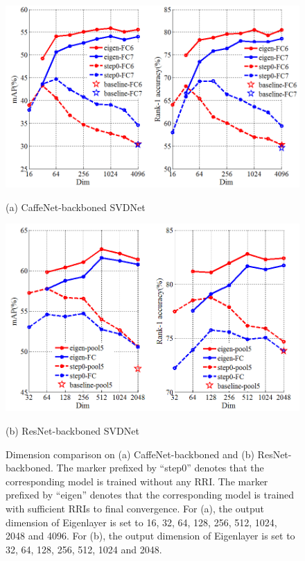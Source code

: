 \documentclass[10pt,twocolumn,letterpaper]{article}
\begin{document}
\begin{figure}[t]
\begin{minipage}[t]{0.48\linewidth}
\centering
	\includegraphics[width=1\linewidth]{CaffeNet.PNG}
\caption*{(a) CaffeNet-backboned SVDNet}
\end{minipage}
\hfill
\begin{minipage}[t]{0.48\linewidth}
\centering
	\includegraphics[width=0.985\linewidth]{ResNet.PNG}
\caption*{(b) ResNet-backboned SVDNet}
\end{minipage}
\setlength{\abovecaptionskip}{0cm}
\caption{Dimension comparison on (a) CaffeNet-backboned and (b) ResNet-backboned. The marker prefixed by ``step0'' denotes that the corresponding model is trained without any RRI. The marker prefixed by ``eigen'' denotes that the corresponding model is trained with sufficient RRIs to final convergence. For (a), the output dimension of Eigenlayer is set to 16, 32, 64, 128, 256, 512, 1024, 2048 and 4096. For (b), the output dimension of Eigenlayer is set to 32, 64, 128, 256, 512, 1024 and 2048.}
\label{fig:dim}
\end{figure}
\end{document}
